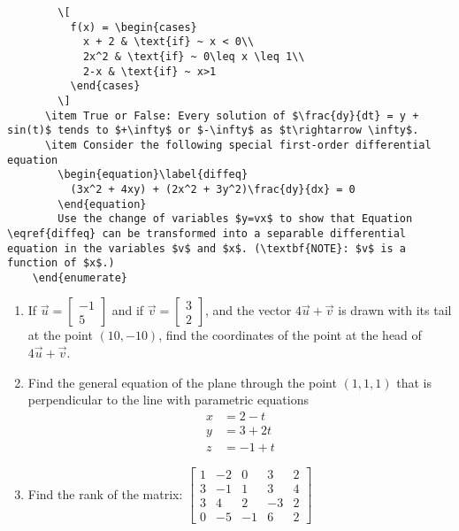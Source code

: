 \documentclass[11pt]{extarticle}
\begin{document}
{\begin{lstlisting}
        \[
          f(x) = \begin{cases}
            x + 2 & \text{if} ~ x < 0\\
            2x^2 & \text{if} ~ 0\leq x \leq 1\\
            2-x & \text{if} ~ x>1
          \end{cases}
        \] 
      \item True or False: Every solution of $\frac{dy}{dt} = y + sin(t)$ tends to $+\infty$ or $-\infty$ as $t\rightarrow \infty$.
      \item Consider the following special first-order differential equation
        \begin{equation}\label{diffeq}
          (3x^2 + 4xy) + (2x^2 + 3y^2)\frac{dy}{dx} = 0
        \end{equation}
        Use the change of variables $y=vx$ to show that Equation \eqref{diffeq} can be transformed into a separable differential equation in the variables $v$ and $x$. (\textbf{NOTE}: $v$ is a function of $x$.)
    \end{enumerate}
  \end{lstlisting}
  \begin{enumerate}
    \item If $\vec{u} = \begin{bmatrix}-1\\5\end{bmatrix}$ and if $\vec{v} = \begin{bmatrix}3\\2\end{bmatrix}$, and the vector $4\vec{u} + \vec{v}$ is drawn with its tail at the point $(10,-10)$, find the coordinates of the point at the head of $4\vec{u} + \vec{v}$.
    \item Find the general equation of the plane through the point $(1,1,1)$ that is perpendicular to the line with parametric equations
      \begin{align*}
        x &= 2-t\\
        y &= 3 + 2t\\
        z &= -1 + t
      \end{align*}
    \item Find the rank of the matrix: $\begin{bmatrix}1 & -2 & 0 & 3 & 2 \\ 3 & -1 & 1 & 3 & 4 \\ 3 & 4 & 2 & -3 & 2 \\ 0 & -5 & -1 & 6 & 2\end{bmatrix}$

\end{enumerate}}
\end{document}
